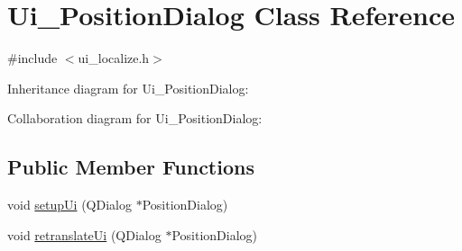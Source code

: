 \hypertarget{class_ui___position_dialog}{}\section{Ui\+\_\+\+Position\+Dialog Class Reference}
\label{class_ui___position_dialog}


{\ttfamily \#include $<$ui\+\_\+localize.\+h$>$}



Inheritance diagram for Ui\+\_\+\+Position\+Dialog\+:


Collaboration diagram for Ui\+\_\+\+Position\+Dialog\+:
\subsection*{Public Member Functions}
\begin{DoxyCompactItemize}
\item 
void \hyperlink{class_ui___position_dialog_a74f7f9b4876185a46b99c2bd10c09032}{setup\+Ui} (Q\+Dialog $\ast$Position\+Dialog)
\item 
void \hyperlink{class_ui___position_dialog_a7242c185183f1130addc8e56c6f6541b}{retranslate\+Ui} (Q\+Dialog $\ast$Position\+Dialog)
\end{DoxyCompactItemize}
